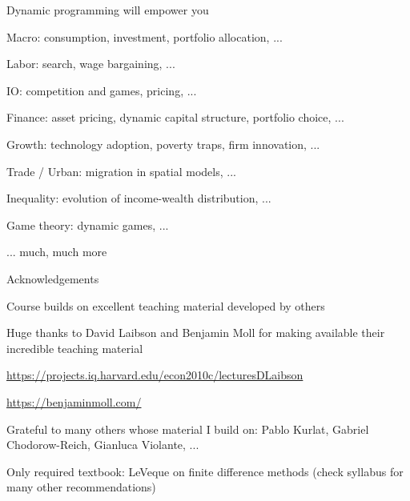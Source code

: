 \documentclass[11pt, aspectratio=169]{beamer}
\newenvironment{witemize}{\itemize\addtolength{\itemsep}{10pt}}{\enditemize}
\begin{document}
\begin{frame}{Dynamic programming will empower you}
\begin{witemize}
\item Macro: consumption, investment, portfolio allocation, ... 

\vspace{-2mm}
\item Labor: search, wage bargaining, ... 

\vspace{-2mm}
\item IO: competition and games, pricing, ...

\vspace{-2mm}
\item Finance: asset pricing, dynamic capital structure, portfolio choice, ... 

\vspace{-2mm}
\item Growth: technology adoption, poverty traps, firm innovation, ... 

\vspace{-2mm}
\item Trade / Urban: migration in spatial models, ... 

\vspace{-2mm}
\item Inequality: evolution of income-wealth distribution, ... 

\vspace{-2mm}
\item Game theory: dynamic games, ... 

\vspace{-2mm}
\item ... much, much more 

\end{witemize}
\end{frame}



\begin{frame}{Acknowledgements}

\begin{witemize}
\item Course builds on excellent teaching material developed by others

\item Huge thanks to David Laibson and Benjamin Moll for making available their incredible teaching material

\url{https://projects.iq.harvard.edu/econ2010c/lecturesDLaibson}

\url{https://benjaminmoll.com/}

\item Grateful to many others whose material I build on: Pablo Kurlat, Gabriel Chodorow-Reich, Gianluca Violante, ...  

\item Only required textbook: LeVeque on finite difference methods (check syllabus for many other recommendations)
\end{witemize}
\end{frame}
\end{document}

